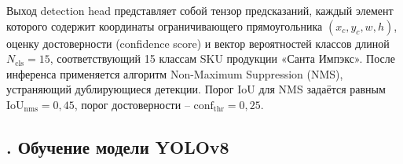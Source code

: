 {  \par \redline Выход detection head представляет собой тензор предсказаний, каждый элемент которого содержит координаты ограничивающего прямоугольника $(x_c, y_c, w, h)$, оценку достоверности (confidence score) и вектор вероятностей классов длиной $N_{\mathrm{cls}} = 15$, соответствующий 15 классам SKU продукции «Санта Импэкс». После инференса применяется алгоритм Non-Maximum Suppression (NMS), устраняющий дублирующиеся детекции. Порог IoU для NMS задаётся равным $\mathrm{IoU}_{\mathrm{nms}} = 0{,}45$, порог достоверности {--} $\mathrm{conf}_{\mathrm{thr}} = 0{,}25$.

  \par
}

\subtitlespace

\subsection*{ 
  \gostTitleFont
  \redline
  \thechaptercntr .\thesubchaptercntr \spc 
  Обучение модели YOLOv8
} \addtocounter{subchaptercntr}{1} 

\subtitlespace

